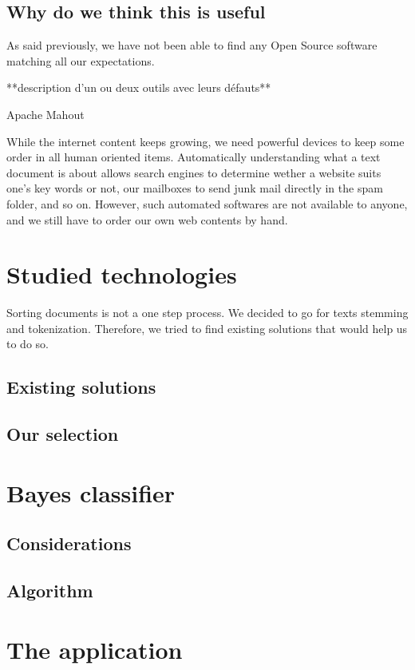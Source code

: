 \documentclass[a4paper,11pt]{article}
\begin{document}
\subsection{Why do we think this is useful}

As said previously, we have not been able to find any Open Source software
matching all our expectations.

	**description d'un ou deux outils avec leurs défauts**
    
Apache Mahout

While the internet content keeps growing, we need powerful devices to keep
some order in all human oriented items. Automatically understanding what a
text document is about allows search engines to determine wether a website
suits one's key words or not, our mailboxes to send junk mail directly in the
spam folder, and so on. However, such automated softwares are not available to
anyone, and we still have to order our own web contents by hand.


\section{Studied technologies}

Sorting documents is not a one step process. We decided to go for texts
stemming and tokenization. Therefore, we tried to find existing solutions that
would help us to do so.

\subsection{Existing solutions}
\subsection{Our selection}


\section{Bayes classifier}
\subsection{Considerations}
\subsection{Algorithm}


\section{The application}
\end{document}
